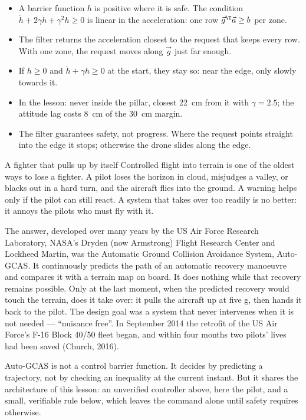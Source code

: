 \begin{remember}
\begin{itemize}
  \item A barrier function $h$ is positive where it is safe. The condition $\ddot h + 2\gamma\dot h + \gamma^2 h \ge 0$ is linear in the acceleration: one row $\vec g^\T\vec a \ge b$ per zone.
  \item The filter returns the acceleration closest to the request that keeps every row. With one zone, the request moves along $\vec g$ just far enough.
  \item If $h \ge 0$ and $\dot h + \gamma h \ge 0$ at the start, they stay so: near the edge, only slowly towards it.
  \item In the lesson: never inside the pillar, closest \SI{22}{cm} from it with $\gamma = 2.5$; the attitude lag costs \SI{8}{cm} of the \SI{30}{cm} margin.
  \item The filter guarantees safety, not progress. Where the request points straight into the edge it stops; otherwise the drone slides along the edge.
\end{itemize}
\end{remember}

\begin{curiosity}{A fighter that pulls up by itself}
Controlled flight into terrain is one of the oldest ways to lose a fighter. A pilot loses the horizon in cloud, misjudges a valley, or blacks out in a hard turn, and the aircraft flies into the ground. A warning helps only if the pilot can still react. A system that takes over too readily is no better: it annoys the pilots who must fly with it.

The answer, developed over many years by the US Air Force Research Laboratory, NASA's Dryden (now Armstrong) Flight Research Center and Lockheed Martin, was the Automatic Ground Collision Avoidance System, Auto-GCAS. It continuously predicts the path of an automatic recovery manoeuvre and compares it with a terrain map on board. It does nothing while that recovery remains possible. Only at the last moment, when the predicted recovery would touch the terrain, does it take over: it pulls the aircraft up at five g, then hands it back to the pilot. The design goal was a system that never intervenes when it is not needed — \enquote{nuisance free}. In September 2014 the retrofit of the US Air Force's F-16 Block 40/50 fleet began, and within four months two pilots' lives had been saved (Church, 2016).

Auto-GCAS is not a control barrier function. It decides by predicting a trajectory, not by checking an inequality at the current instant. But it shares the architecture of this lesson: an unverified controller above, here the pilot, and a small, verifiable rule below, which leaves the command alone until safety requires otherwise.
\end{curiosity}

